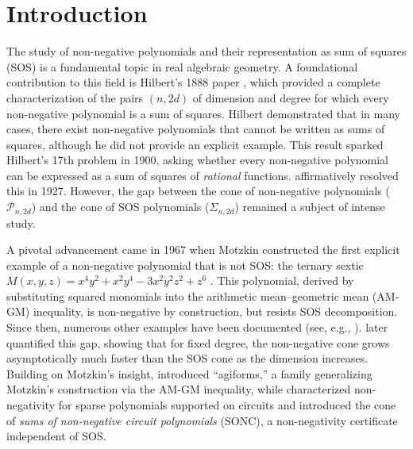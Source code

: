 \documentclass[12pt]{elsarticle}
\theoremstyle{definition}
\begin{document}
\section{Introduction}\label{sec:intro}

The study of non-negative polynomials and their representation as sum of squares (SOS) is a fundamental topic in real algebraic geometry. A foundational contribution to this field is Hilbert's 1888 paper \cite{hilbert1888darstellung}, which provided a complete characterization of the pairs $(n, 2d)$ of dimension and degree for which every non-negative polynomial is a sum of squares. Hilbert demonstrated that in many cases, there exist non-negative polynomials that cannot be written as sums of squares, although he did not provide an explicit example. This result sparked Hilbert's 17th problem in 1900, asking whether every non-negative polynomial can be expressed as a sum of squares of \textit{rational} functions. \citet{artin1927zerlegung} affirmatively resolved this in 1927. However, the gap between the cone of non-negative polynomials ($\mathcal{P}_{n,2d}$) and the cone of SOS polynomials ($\Sigma_{n,2d}$) remained a subject of intense study.

A pivotal advancement came in 1967 when Motzkin constructed the first explicit example of a non-negative polynomial that is not SOS: the ternary sextic $M(x,y,z) = x^4 y^2 + x^2 y^4 - 3 x^2 y^2 z^2 + z^6$ \citep{motzkin1967arithmetic}. This polynomial, derived by substituting squared monomials into the arithmetic mean--geometric mean (AM-GM) inequality, is non-negative by construction, but resists SOS decomposition. Since then, numerous other examples have been documented (see, e.g., \cite{choi1977extremal, choi1977old, choi1980real, reznick2000some, robinson1973some}). \citet{blekherman2006there} later quantified this gap, showing that for fixed degree, the non-negative cone grows asymptotically much faster than the SOS cone as the dimension increases. Building on Motzkin's insight, \citet{reznick1989forms} introduced ``agiforms,'' a family generalizing Motzkin's construction via the AM-GM inequality, while \citet{iliman2016amoebas} characterized non-negativity for sparse polynomials supported on circuits and introduced the cone of \emph{sums of non-negative circuit polynomials} (SONC), a non-negativity certificate independent of SOS.
\end{document}
